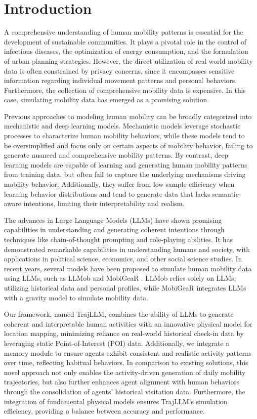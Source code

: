 \section{Introduction}
A comprehensive understanding of human mobility patterns is essential for the development of sustainable communities. It plays a pivotal role in the control of infectious diseases, the optimization of energy consumption, and the formulation of urban planning strategies. However, the direct utilization of real-world mobility data is often constrained by privacy concerns, since it encompasses sensitive information regarding individual movement patterns and personal behaviors. Furthermore, the collection of comprehensive mobility data is expensive. In this case, simulating mobility data has emerged as a promising solution. 

Previous approaches to modeling human mobility can be broadly categorized into mechanistic and deep learning models. Mechanistic models leverage stochastic processes to characterize human mobility behaviors, while these models tend to be oversimplified and focus only on certain aspects of mobility behavior, failing to generate nuanced and comprehensive mobility patterns. By contrast, deep learning models are capable of learning and generating human mobility patterns from training data, but often fail to capture the underlying mechanisms driving mobility behavior. Additionally, they suffer from low sample efficiency when learning behavior distributions and tend to generate data that lacks semantic-aware intentions, limiting their interpretability and realism.

The advances in Large Language Models (LLMs) have shown promising capabilities in understanding and generating coherent intentions through techniques like chain-of-thought prompting and role-playing abilities. It has demonstrated remarkable capabilities in understanding humans and society, with applications in political science, economics, and other social science studies. In recent years, several models have been proposed to simulate human mobility data using LLMs, such as LLMob \cite{wang2024large} and MobiGeaR \cite{shao2024beyond}. LLMob relies solely on LLMs, utilizing historical data and personal profiles, while MobiGeaR integrates LLMs with a gravity model to simulate mobility data.

Our framework, named TrajLLM, combines the ability of LLMs to generate coherent and interpretable human activities with an innovative physical model for location mapping, minimizing reliance on real-world historical check-in data by leveraging static Point-of-Interest (POI) data. Additionally, we integrate a memory module to ensure agents exhibit consistent and realistic activity patterns over time, reflecting habitual behaviors. 
In comparison to existing solutions, this novel approach not only enables the activity-driven generation of daily mobility trajectories, but also further enhances agent alignment with human behaviors through the consolidation of agents' historical visitation data. Furthermore, the integration of fundamental physical models ensures TrajLLM's simulation efficiency, providing a balance between accuracy and performance.

